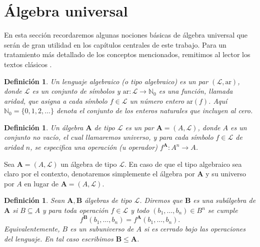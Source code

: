\documentclass[12pt]{book}
\newtheorem{definition}[theorem]{Definición}
\begin{document}
\section{Álgebra universal}

En esta sección recordaremos algunas nociones básicas de álgebra universal que serán de gran utilidad en los capítulos centrales de este trabajo. Para un tratamiento más detallado de los conceptos mencionados, remitimos al lector los textos clásicos \cite{BD,BS}.

\begin{definition}\label{def:lenguaje-algebraico}
Un \emph{lenguaje algebraico} (o \emph{tipo algebraico}) es un par \( (\mathcal{L},\mathrm{ar}) \),
donde \( \mathcal{L} \) es un conjunto de símbolos y \( \mathrm{ar}\colon \mathcal{L}\to\mathbb{N}_{0} \) es una función, llamada \emph{aridad}, que asigna a cada símbolo \( f\in\mathcal{L} \) un número entero \( \mathrm{ar}(f) \).
Aquí \( \mathbb{N}_0=\{0,1,2,\dots\} \) denota el conjunto de los enteros naturales que incluyen al cero.
\end{definition}


\begin{definition}\label{def:algebra}
Un \emph{álgebra} \( \mathbf{A} \) de tipo \( \mathcal{L} \) es un par
\( \mathbf{A}=(A,\mathcal{L}) \), donde \( A \) es un conjunto no vacío, el cual llamaremos \emph{universo},
y para cada símbolo \( f\in\mathcal{L} \) de aridad \( n \),
se especifica una operación (u operador) \( f^{\mathbf{A}}\colon A^{n}\to A \).
\end{definition}

Sea $\mathbf{A} = (A,\mathcal{L})$ un álgebra de tipo $\mathcal{L}$. En caso de que el tipo algebraico sea claro por el contexto, denotaremos simplemente el álgebra por \( \mathbf{A} \) y su universo por \( A \) en lugar de $\mathbf{A} = (A,\mathcal{L})$.

\begin{definition}\label{def:subalgebra}
Sean \( \mathbf{A},\mathbf{B} \) álgebras de tipo \( \mathcal{L} \).
Diremos que \( \mathbf{B} \) es una \emph{subálgebra} de \( \mathbf{A} \)
si \( B\subseteq A \) y para toda operación \( f\in\mathcal{L} \) y todo
\( (b_{1},\dots,b_{n})\in B^{n} \) se cumple
\[
f^{\mathbf{B}}(b_{1},\dots,b_{n}) = f^{\mathbf{A}}(b_{1},\dots,b_{n}).
\]
Equivalentemente, \( B \) es un \emph{subuniverso} de \( A \) si es cerrado bajo las operaciones del lenguaje.
En tal caso escribimos \( \mathbf{B}\leq \mathbf{A} \).
\end{definition}
\end{document}
